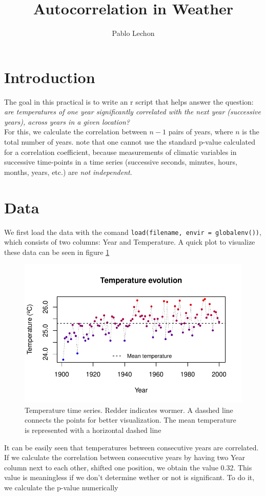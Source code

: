 \documentclass[12pt]{article}
\title{Autocorrelation in Weather}
\author{Pablo Lechon}
\date{}
\begin{document}
	\maketitle	
	\section{Introduction}
		The goal in this practical is to write an r script that helps answer the question: \textit{are temperatures of one year significantly correlated with the next year (successive years), across years in a given location?}\\
		For this, we calculate the correlation between $n - 1$ pairs of years, where $n$ is the total number of years. note that one cannot use the standard p-value calculated for a correlation coefficient, because measurements of climatic variables in successive time-points in a time series (successive seconds, minutes, hours, months, years, etc.) are \textit{not independent}.

	\section{Data}
		We first load the data with the comand \verb|load(filename, envir = globalenv())|, which consists of two columns: Year and Temperature. A quick plot to visualize these data can be seen in figure \ref{temp}\\
		\begin{figure}
			\includegraphics[width = \linewidth]{temp_evolution.pdf}	
			\centering
			\caption{Temperature time series. Redder indicates wormer. A dasshed line connects the points for better visualization. The mean temperature is represented with a horizontal dashed line}
			\label{temp}
		\end{figure}
		It can be easily seen that temperatures between consecutive years are correlated. If we calculate the correlation between consecutive years by having two Year column next to each other, shifted one position, we obtain the value 0.32. This value is meaningless if we don't determine wether or not is significant. To do it, we calculate the p-value numerically\\
\end{document}
